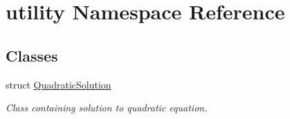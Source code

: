 \hypertarget{namespaceutility}{}\section{utility Namespace Reference}
\label{namespaceutility}
\subsection*{Classes}
\begin{DoxyCompactItemize}
\item 
struct \mbox{\hyperlink{structutility_1_1QuadraticSolution}{Quadratic\+Solution}}
\begin{DoxyCompactList}\small\item\em Class containing solution to quadratic equation. \end{DoxyCompactList}\end{DoxyCompactItemize}
